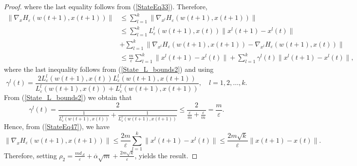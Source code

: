 \documentclass[11pt]{article}
\numberwithin{equation}{section}
\begin{document}
\begin{proof}
where the last equality follows from (\ref{StateEq33}). Therefore,
\begin{align}
	\| \nabla_x H_{\varepsilon}(w(t+1),x(t+1)) \| 
	&\leq \sum\limits_{l=1}^{k} \| \nabla_{x^l} H_{\varepsilon}(w(t+1),x(t+1)) \| \\
	&\leq \sum\limits_{l=1}^{k} L^l_{\varepsilon}(w(t+1),x(t)) \|x^l(t+1) - x^l(t)\| \\
	&+ \sum\limits_{l=1}^{k} \| \nabla_{x^l} H_{\varepsilon}(w(t+1),x(t+1)) - \nabla_{x^l} H_{\varepsilon}(w(t+1),x(t))\| \\
	&\leq \frac{m}{\varepsilon} \sum\limits_{l=1}^{k} \|x^l(t+1)-x^l(t)\| + \sum\limits_{l=1}^{k} \gamma^l(t) \|x^l(t+1)-x^l(t)\| , \label{StateEq47}
\end{align}
where the last inequality follows from (\ref{State_L_bounds2}) and  using
\begin{equation*}
	\gamma^l(t) = \frac{2 L^l_{\varepsilon}(w(t+1),x(t)) L^l_{\varepsilon}(w(t+1),x(t+1))}{L^l_{\varepsilon}(w(t+1),x(t)) + L^l_{\varepsilon}(w(t+1),x(t+1))} , \quad l=1,2, \ldots, k.
\end{equation*}
From (\ref{State_L_bounds2}) we obtain that
\begin{equation*}
	\gamma^l(t) = \frac{2}{\frac{1}{L^l_{\varepsilon}(w(t+1),x(t))} + \frac{1}{L^l_{\varepsilon}(w(t+1),x(t+1))}} \leq \frac{2}{\frac{\varepsilon}{m} + \frac{\varepsilon}{m}} = \frac{m}{\varepsilon} .
\end{equation*}
Hence, from (\ref{StateEq47}), we have 
\begin{equation*}
	\| \nabla_x H_{\varepsilon}(w(t+1),x(t+1))\| \leq \frac{2m}{\varepsilon} \sum\limits_{l=1}^{k} \|x^l(t+1)-x^l(t)\| \leq \frac{2m\sqrt{k}}{\varepsilon} \|x(t+1) - x(t)\|.
\end{equation*}
Therefore, setting $\rho_2 =  \frac{m d_{\mathcal{A}}}{\varepsilon} + \overline{\alpha}\sqrt{m} + \frac{2m\sqrt{k}}{\varepsilon}$, yields the result.
\end{proof}
\end{document}

